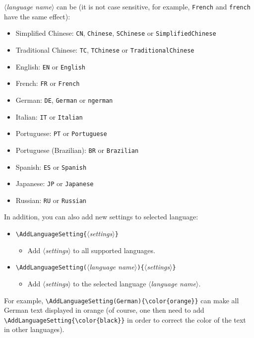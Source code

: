 \documentclass[allowbf,puretext]{colorart}
\theoremstyle{basic}
\theoremstyle{emphasis}
\theoremstyle{simple}
\providecommand{\meta}[1]{$\langle${\normalfont\itshape#1}$\rangle$}
\begin{document}
\meta{language name} can be (it is not case sensitive, for example, \texttt{French} and \texttt{french} have the same effect):
\begin{itemize}
    \item Simplified Chinese: \texttt{CN}, \texttt{Chinese}, \texttt{SChinese} or \texttt{SimplifiedChinese}
    \item Traditional Chinese: \texttt{TC}, \texttt{TChinese} or \texttt{TraditionalChinese}
    \item English: \texttt{EN} or \texttt{English}
    \item French: \texttt{FR} or \texttt{French}
    \item German: \texttt{DE}, \texttt{German} or \texttt{ngerman}
    \item Italian: \texttt{IT} or \texttt{Italian}
    \item Portuguese: \texttt{PT} or \texttt{Portuguese}
    \item Portuguese (Brazilian): \texttt{BR} or \texttt{Brazilian}
    \item Spanish: \texttt{ES} or \texttt{Spanish}
    \item Japanese: \texttt{JP} or \texttt{Japanese}
    \item Russian: \texttt{RU} or \texttt{Russian}
\end{itemize}

\medskip
In addition, you can also add new settings to selected language:
\begin{itemize}
    \item \lstinline|\AddLanguageSetting{|\meta{settings}\lstinline|}|
    \begin{itemize}
        \item Add \meta{settings} to all supported languages.
    \end{itemize}
    \item \lstinline|\AddLanguageSetting(|\meta{language name}\lstinline|){|\meta{settings}\lstinline|}|
    \begin{itemize}
        \item Add \meta{settings} to the selected language \meta{language name}.
    \end{itemize}
\end{itemize}
For example, \lstinline|\AddLanguageSetting(German){\color{orange}}| can make all German text displayed in orange (of course, one then need to add \lstinline|\AddLanguageSetting{\color{black}}| in order to correct the color of the text in other languages).
\end{document}
